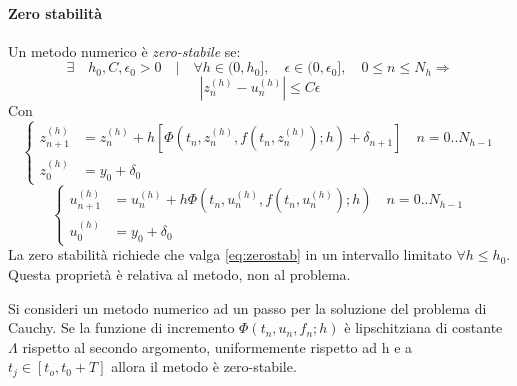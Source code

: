 \paragraph{Zero stabilità}
Un metodo numerico è \emph{zero-stabile} se: \[\exists \quad
h_0, C, \epsilon_0 >0 \quad|\quad \forall h\in (0, h_0], \quad \epsilon \in (0, \epsilon_0], \quad 0\leq n \leq N_h \Rightarrow \] 
\begin{equation} \label{eq:zerostab} \left|z_n^{(h)}-u_n^{(h)} \right|\leq C\epsilon \end{equation}
Con \[\begin{cases}
z_{n+1}^{(h)}&=z_n^{(h)} + h\left[ \Phi (t_n, z_n^{(h)}, f(t_n, z_n^{(h)});h) + \delta_{n+1} \right] \quad n=0..N_{h-1}
\\ z_0^{(h)}&= y_0 + \delta_0 
\end{cases} \]\[ \begin{cases}
u_{n+1}^{(h)}&=u_n^{(h)} + h\Phi (t_n, u_n^{(h)}, f(t_n, u_n^{(h)});h) \quad n=0..N_{h-1}
\\ u_0^{(h)}&= y_0 + \delta_0  \end{cases} \]
La zero stabilità richiede che valga \ref{eq:zerostab} in un intervallo limitato $\forall h\leq h_0$. Questa proprietà è relativa al metodo, non al problema. 
\begin{theorem} \label{teo:zerostab}
Si consideri un metodo numerico ad un passo per la soluzione del problema di Cauchy. Se la funzione di incremento $\Phi(t_n, u_n,f_n;h)$ è lipschitziana di costante $\Lambda$ rispetto al secondo argomento, uniformemente rispetto ad h e a $t_j \in [t_o, t_0 +T]$ allora il metodo è zero-stabile.  \cite{Quarteroni} \end{theorem}
